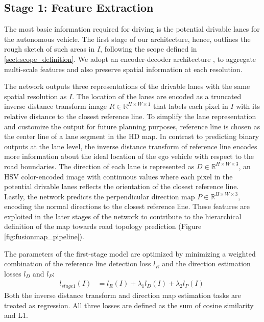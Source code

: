 \documentclass[10pt,twocolumn,letterpaper]{article}
\begin{document}
\subsection{Stage 1: Feature Extraction}
\label{sect:drivable_lane_estimation}
The most basic information required for driving is the potential drivable lanes for the autonomous vehicle. The first stage of our architecture, hence, outlines the rough sketch of such areas in $I$, following the scope defined in \ref{sect:scope_definition}. We adopt an encoder-decoder architecture \cite{chaurasia2017linknet}, to aggregate multi-scale features and also preserve spatial information at each resolution. 

The network outputs three representations of the drivable lanes with the same spatial resolution as $I$. The location of the lanes are encoded as a truncated inverse distance transform image $R \in \mathbb{R}^{H \times W \times 1}$ that labels each pixel in $I$ with its relative distance to the closest reference line. To simplify the lane representation and customize the output for future planning purposes, reference line is chosen as the center line of a lane segment in the HD map. In contrast to predicting binary outputs at the lane level, the inverse distance transform of reference line encodes more information about the ideal location of the ego vehicle with respect to the road boundaries. The direction of each lane is represented as $D \in \mathbb{R}^{H \times W \times 3}$, an HSV color-encoded image with continuous values where each pixel in the potential drivable lanes reflects the orientation of the closest reference line. Lastly, the network predicts the perpendicular direction map $P \in \mathbb{R}^{H \times W \times 3}$, encoding the normal directions to the closest reference line. These features are exploited in the later stages of the network to contribute to the hierarchical definition of the map towards road topology prediction (Figure \ref{fig:fusionmap_pipeline}). 

The parameters of the first-stage model are optimized by minimizing a weighted combination of the reference line detection loss $l_{R}$ and the direction estimation losses $l_{D}$ and $l_{P}$:
\begin{align}
  l_{stage1} (I) & = l_{R} (I) + \lambda_{1}l_{D} (I) + \lambda_{2}l_{P} (I) \; 
\end{align}
Both the inverse distance transform and direction map estimation tasks are treated as regression. All three losses are defined as the sum of cosine similarity and L1.
\end{document}
